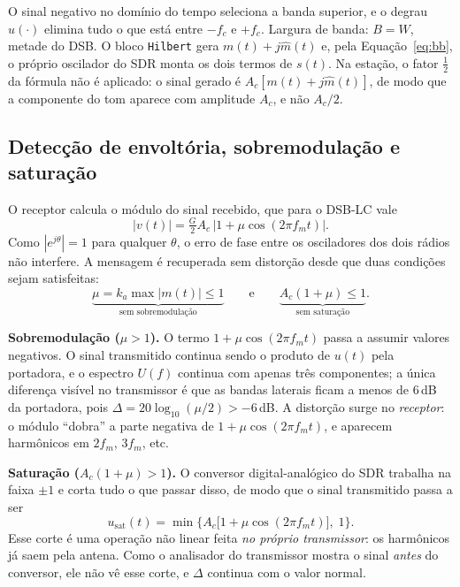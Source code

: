 \documentclass[11pt,a4paper]{article}
\begin{document}
O sinal negativo no domínio do tempo seleciona a banda superior, e o degrau
$u(\cdot)$ elimina tudo o que está entre $-f_c$ e $+f_c$. Largura de banda:
$B = W$, metade do DSB. O bloco \texttt{Hilbert} gera
$m(t) + j\hat{m}(t)$ e, pela Equação~\eqref{eq:bb}, o próprio oscilador do SDR
monta os dois termos de $s(t)$. Na estação, o fator $\tfrac{1}{2}$ da fórmula
não é aplicado: o sinal gerado é $A_c[m(t) + j\hat{m}(t)]$, de modo que a
componente do tom aparece com amplitude $A_c$, e não $A_c/2$.

\subsection*{Detecção de envoltória, sobremodulação e saturação}

O receptor calcula o módulo do sinal recebido, que para o DSB-LC vale
\begin{equation}
      |v(t)| = \tfrac{G}{2}A_c\,\big|1 + \mu\cos(2\pi f_m t)\big|.
\end{equation}
Como $|e^{j\theta}| = 1$ para qualquer $\theta$, o erro de fase entre os
osciladores dos dois rádios não interfere. A mensagem é recuperada sem
distorção desde que duas condições sejam satisfeitas:
\begin{equation}
      \underbrace{\mu = k_a\max|m(t)| \leq 1}_{\text{sem sobremodulação}}
      \qquad\text{e}\qquad
      \underbrace{A_c(1 + \mu) \leq 1}_{\text{sem saturação}}.
      \label{eq:cond}
\end{equation}

\textbf{Sobremodulação ($\mu > 1$).} O termo $1 + \mu\cos(2\pi f_m t)$ passa a
assumir valores negativos. O sinal transmitido continua sendo o produto de
$u(t)$ pela portadora, e o espectro $U(f)$ continua com apenas três
componentes; a única diferença visível no transmissor é que as bandas laterais
ficam a menos de 6\,dB da portadora, pois
$\Delta = 20\log_{10}(\mu/2) > -6$\,dB. A distorção surge no \emph{receptor}: o
módulo ``dobra'' a parte negativa de $1 + \mu\cos(2\pi f_m t)$, e aparecem
harmônicos em $2f_m$, $3f_m$, etc.

\textbf{Saturação ($A_c(1 + \mu) > 1$).} O conversor digital-analógico do SDR
trabalha na faixa $\pm 1$ e corta tudo o que passar disso, de modo que o sinal
transmitido passa a ser
\begin{equation}
      u_\text{sat}(t) = \min\big\{A_c\big[1 + \mu\cos(2\pi f_m t)\big],\; 1\big\}.
\end{equation}
Esse corte é uma operação não linear feita \emph{no próprio transmissor}: os
harmônicos já saem pela antena. Como o analisador do transmissor mostra o sinal
\emph{antes} do conversor, ele não vê esse corte, e $\Delta$ continua com o valor
normal.
\end{document}
